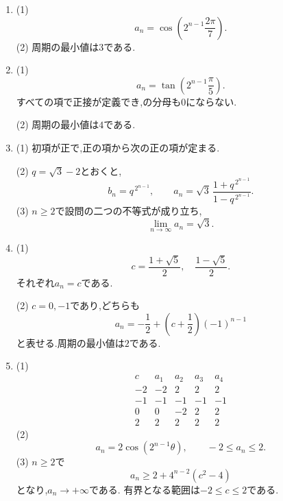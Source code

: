 \begin{enumerate}[label=\textbf{問\arabic*.},leftmargin=3.8em,format=\bookitemlink{practice-special}{answer}{solution}]
    \par\smallskip\noindent
    (2)
    \[
      a_n=2^{\,3^{n-1}}+2^{-3^{n-1}}.
    \]
  \item (1)
    \[
      a_n=\cos\left(2^{n-1}\frac{2\pi}{7}\right).
    \]
    (2) 周期の最小値は$3$である.
  \item (1)
    \[
      a_n=\tan\left(2^{n-1}\frac{\pi}{5}\right).
    \]
    すべての項で正接が定義でき,の分母も$0$にならない.
    \par\smallskip\noindent
    (2) 周期の最小値は$4$である.
  \item (1) 初項が正で,正の項から次の正の項が定まる.
    \par\smallskip\noindent
    (2) $q=\sqrt3-2$とおくと,
    \[
      b_n=q^{\,2^{n-1}},\qquad
      a_n=\sqrt3\,\frac{1+q^{\,2^{n-1}}}{1-q^{\,2^{n-1}}}.
    \]
    (3) $n\ge2$で設問の二つの不等式が成り立ち,
    \[
      \lim_{n\to\infty}a_n=\sqrt3.
    \]
  \item (1)
    \[
      c=\frac{1+\sqrt5}{2},\quad
      \frac{1-\sqrt5}{2}.
    \]
    それぞれ$a_n=c$である.
    \par\smallskip\noindent
    (2) $c=0,-1$であり,どちらも
    \[
      a_n=-\frac12+\left(c+\frac12\right)(-1)^{n-1}
    \]
    と表せる.周期の最小値は$2$である.
  \item (1)
    \[
      \begin{array}{c|rrrr}
        c&a_1&a_2&a_3&a_4\\ \hline
        -2&-2&2&2&2\\
        -1&-1&-1&-1&-1\\
        0&0&-2&2&2\\
        2&2&2&2&2
      \end{array}
    \]
    (2)
    \[
      a_n=2\cos(2^{n-1}\theta),\qquad -2\le a_n\le2.
    \]
    (3) $n\ge2$で
    \[
      a_n\ge2+4^{n-2}(c^2-4)
    \]
    となり,$a_n\to+\infty$である.
    有界となる範囲は$-2\le c\le2$である.
\end{enumerate}

